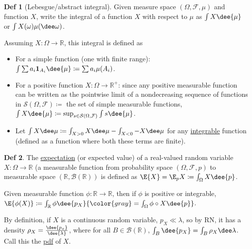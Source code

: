 \documentclass[a4paper]{article}
\theoremstyle{definition}
\newtheorem*{definition}{Def}
\newcommand\gray[1]{{\color{gray}#1}}
\newcommand\key\uline%
\begin{document}
\noindent\hrulefill

\begin{definition}[Lebesgue/abstract integral]
  Given measure space $(\Omega,\mathcal{F},\mu)$ and function $X$,
  write the integral of a function $X$ with respect to $\mu$ as
  $\int X\dee{\mu}$ or $\int X(\omega)\mu(\dee\omega)$.

  Assuming $X:\Omega \to \mathbb{R}$, this integral is defined as \citep[][section 1.2]{lanchier.n:2017ch1}
  \begin{itemize}[nosep]
    \item For a simple function (one with finite range):
      $\int \sum a_i \mathbf{1}_{A_i} \dee{\mu} \coloneqq \sum a_i \mu(A_i)$.
    \item For a positive function $X:\Omega\to\mathbb{R}^+$:
      since any positive measurable function can be
      written as the pointwise limit of a nondecreasing sequence of functions in
      $\mathcal{S}(\Omega,\mathcal{F}) \coloneqq$ the set of simple measurable
      functions,%
      $\int X \dee{\mu}
      \coloneqq \sup_{s\in\mathcal{S}(\Omega,\mathcal{F})}\int s \dee{\mu}$.
    \item Let $\int X\dee\mu 
      \coloneqq \int_{X>0} X\dee\mu -\int_{X<0} -X\dee\mu$ for any
      \key{integrable} function (defined as a function where both these terms
      are finite).
  \end{itemize}
\end{definition}

\begin{definition}
  The \key{expectation} (or expected value) of a real-valued random variable
  $X:\Omega\to \mathbb{R}$ (a measurable function from probability space
  $(\Omega,\mathcal{F},p)$ to measurable space
  $(\mathbb{R},\mathcal{B}(\mathbb{R}))$ is defined as $\E{X}=\E_p{X}\coloneqq
  \int_\Omega X \dee{p}$.

  Given measurable function $\phi:\mathbb{R}\to\mathbb{R}$,
  then if $\phi$ is positive or integrable, 
  $\E{\phi(X)}\coloneqq \int_\mathbb{R} \phi \dee{p_X}
  \gray{
    = \int_\Omega \phi\circ X \dee{p}
  }$.
\end{definition}

By definition, if $X$ is a continuous random variable, $p_X\ll\lambda$, so by
RN, it has a density $\rho_X=\frac{\dee{p_x}}{\dee{\lambda}}$, where for all
$B\in\mathcal{B}(\mathbb{R})$, $\int_B \dee{p_X} = \int_B \rho_X \dee\lambda$.
Call this the \key{pdf} of $X$.
\end{document}

